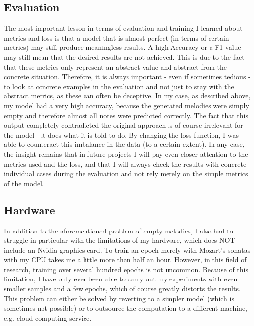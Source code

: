 \documentclass[a4paper, 10pt, xcolor=dvipsnames]{article} %
\begin{document}
\subsection{Evaluation}
The most important lesson in terms of evaluation and training I learned about
metrics and loss is that a model that is almost perfect (in terms of certain
metrics) may still produce meaningless results. A high Accuracy or a F1 value
may still mean that the desired results are not achieved. This is due to the
fact that these metrics only represent an abstract value and abstract from the
concrete situation. Therefore, it is always important - even if sometimes
tedious - to look at concrete examples in the evaluation and not just to stay
with the abstract metrics, as these can often be deceptive. In my case, as
described above, my model had a very high accuracy, because the generated
melodies were simply empty and therefore almost all notes were predicted
correctly. The fact that this output completely contradicted the original
approach is of course irrelevant for the model - it does what it is told to do.
By changing the loss function, I was able to counteract this imbalance in the
data (to a certain extent). In any case, the insight remains that in future
projects I will pay even closer attention to the metrics used and the loss, and
that I will always check the results with concrete individual cases during the
evaluation and not rely merely on the simple metrics of the model.

\subsection{Hardware}
In addition to the aforementioned problem of empty melodies, I also had to
struggle in particular with the limitations of my hardware, which does NOT
include an Nvidia graphics card. To train an epoch merely with Mozart's sonatas
with my CPU takes me a little more than half an hour. However, in this field of
research, training over several hundred epochs is not uncommon. Because of this
limitation, I have only ever been able to carry out my experiments with even
smaller samples and a few epochs, which of course greatly distorts the results.
This problem can either be solved by reverting to a simpler model (which is
sometimes not possible) or to outsource the computation to a different machine,
e.g. cloud computing service.
\end{document}
